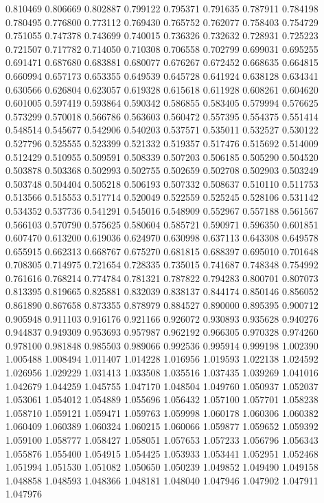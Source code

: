 0.810469
0.806669
0.802887
0.799122
0.795371
0.791635
0.787911
0.784198
0.780495
0.776800
0.773112
0.769430
0.765752
0.762077
0.758403
0.754729
0.751055
0.747378
0.743699
0.740015
0.736326
0.732632
0.728931
0.725223
0.721507
0.717782
0.714050
0.710308
0.706558
0.702799
0.699031
0.695255
0.691471
0.687680
0.683881
0.680077
0.676267
0.672452
0.668635
0.664815
0.660994
0.657173
0.653355
0.649539
0.645728
0.641924
0.638128
0.634341
0.630566
0.626804
0.623057
0.619328
0.615618
0.611928
0.608261
0.604620
0.601005
0.597419
0.593864
0.590342
0.586855
0.583405
0.579994
0.576625
0.573299
0.570018
0.566786
0.563603
0.560472
0.557395
0.554375
0.551414
0.548514
0.545677
0.542906
0.540203
0.537571
0.535011
0.532527
0.530122
0.527796
0.525555
0.523399
0.521332
0.519357
0.517476
0.515692
0.514009
0.512429
0.510955
0.509591
0.508339
0.507203
0.506185
0.505290
0.504520
0.503878
0.503368
0.502993
0.502755
0.502659
0.502708
0.502903
0.503249
0.503748
0.504404
0.505218
0.506193
0.507332
0.508637
0.510110
0.511753
0.513566
0.515553
0.517714
0.520049
0.522559
0.525245
0.528106
0.531142
0.534352
0.537736
0.541291
0.545016
0.548909
0.552967
0.557188
0.561567
0.566103
0.570790
0.575625
0.580604
0.585721
0.590971
0.596350
0.601851
0.607470
0.613200
0.619036
0.624970
0.630998
0.637113
0.643308
0.649578
0.655915
0.662313
0.668767
0.675270
0.681815
0.688397
0.695010
0.701648
0.708305
0.714975
0.721654
0.728335
0.735015
0.741687
0.748348
0.754992
0.761616
0.768214
0.774784
0.781321
0.787822
0.794283
0.800701
0.807073
0.813395
0.819665
0.825881
0.832039
0.838137
0.844174
0.850146
0.856052
0.861890
0.867658
0.873355
0.878979
0.884527
0.890000
0.895395
0.900712
0.905948
0.911103
0.916176
0.921166
0.926072
0.930893
0.935628
0.940276
0.944837
0.949309
0.953693
0.957987
0.962192
0.966305
0.970328
0.974260
0.978100
0.981848
0.985503
0.989066
0.992536
0.995914
0.999198
1.002390
1.005488
1.008494
1.011407
1.014228
1.016956
1.019593
1.022138
1.024592
1.026956
1.029229
1.031413
1.033508
1.035516
1.037435
1.039269
1.041016
1.042679
1.044259
1.045755
1.047170
1.048504
1.049760
1.050937
1.052037
1.053061
1.054012
1.054889
1.055696
1.056432
1.057100
1.057701
1.058238
1.058710
1.059121
1.059471
1.059763
1.059998
1.060178
1.060306
1.060382
1.060409
1.060389
1.060324
1.060215
1.060066
1.059877
1.059652
1.059392
1.059100
1.058777
1.058427
1.058051
1.057653
1.057233
1.056796
1.056343
1.055876
1.055400
1.054915
1.054425
1.053933
1.053441
1.052951
1.052468
1.051994
1.051530
1.051082
1.050650
1.050239
1.049852
1.049490
1.049158
1.048858
1.048593
1.048366
1.048181
1.048040
1.047946
1.047902
1.047911
1.047976
